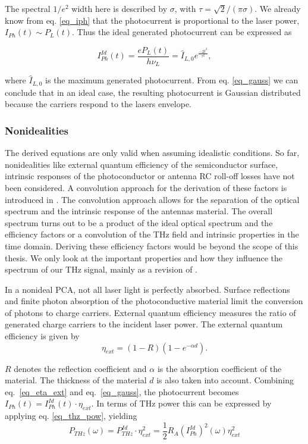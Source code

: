 The spectral $1/e^2$ width here is described by $\sigma$, with $\tau = \sqrt{2}/(\pi \sigma)$. We already know from eq. \eqref{eq_iph} that the photocurrent is proportional to the laser power, $I_{Ph}(t) \sim P_L(t)$. Thus the ideal generated photocurrent can be expressed as 

\begin{equation}
	I_{Ph}^{Id}(t) = \frac{eP_L(t)}{h\nu_L} = \hat{I}_{L,0} e^{\frac{-2t^2}{\tau^2}},
\label{eq_gauss}
\end{equation}

where $\hat{I}_{L,0}$ is the maximum generated photocurrent. From eq. \eqref{eq_gauss} we can conclude that in an ideal case, the resulting photocurrent is Gaussian distributed because the carriers respond to the lasers envelope. 

\subsubsection{Nonidealities}

The derived equations are only valid when assuming idealistic conditions. So far, nonidealities like external quantum efficiency of the semiconductor surface, intrinsic responses of the photoconductor or antenna RC roll-off losses have not been considered. A convolution approach for the derivation of these factors is introduced in \cite{preuUnifiedDerivationTerahertz2014}. The convolution approach allows for the separation of the optical spectrum and the intrinsic response of the antennas material. The overall spectrum turns out to be a product of the ideal optical spectrum and the efficiency factors or a convolution of the THz field and intrinsic properties in the time domain. Deriving these efficiency factors would be beyond the scope of this thesis. We only look at the important properties and how they influence the spectrum of our THz signal, mainly as a revision of \cite{faridiPulsedFreeSpace2023}.

In a nonideal PCA, not all laser light is perfectly absorbed. Surface reflections and finite photon absorption of the photoconductive material limit the conversion of photons to charge carriers. External quantum efficiency measures the ratio of generated charge carriers to the incident laser power. The external quantum efficiency is given by 
\begin{equation}
	\eta_{ext} = (1-R)(1-e^{-\alpha d}). 
	\label{eq_eta_ext}
\end{equation}

$R$ denotes the reflection coefficient and $\alpha$ is the absorption coefficient of the material. The thickness of the material $d$ is also taken into account. Combining eq.~\eqref{eq_eta_ext} and eq.~\eqref{eq_gauss}, the photocurrent becomes $I_{Ph}(t) = I_{Ph}^{Id}(t) \cdot \eta_{ext}$. In terms of THz power this can be expressed by applying eq. \eqref{eq_thz_pow}, yielding
\begin{equation}
	P_{THz}(\omega) = P_{THz}^{Id} \cdot \eta_{ext}^2 = \frac{1}{2}R_A (I_{Ph}^{Id})^2(\omega)\eta_{ext}^2
\end{equation}

